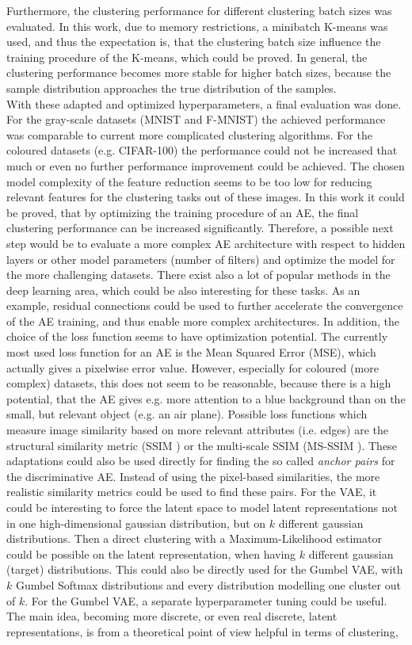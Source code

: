 \documentclass[12pt,DIV14,BCOR12mm,a4paper,footexclude,headinclude,halfparskip-,twoside,openright,cleardoubleempty,idxtotoc,bibtotoc,listtotoc,abstracton]{scrreprt} %
\numberwithin{equation}{chapter}
\begin{document}
Furthermore, the clustering performance for different clustering batch sizes was evaluated. In this work, due to memory restrictions, a minibatch K-means was used, and thus the expectation is, that the clustering batch size influence the training procedure of the K-means, which could be proved. In general, the clustering performance becomes more stable for higher batch sizes, because the sample distribution approaches the true distribution of the samples.\\
With these adapted and optimized hyperparameters, a final evaluation was done. For the gray-scale datasets (MNIST and F-MNIST) the achieved performance was comparable to current more complicated clustering algorithms. For the coloured datasets (e.g. CIFAR-100) the performance could not be increased that much or even no further performance improvement could be achieved. The chosen model complexity of the feature reduction seems to be too low for reducing relevant features for the clustering tasks out of these images. In this work it could be proved, that by optimizing the training procedure of an AE, the final clustering performance can be increased significantly. Therefore, a possible next step would be to evaluate a more complex AE architecture with respect to hidden layers or other model parameters (number of filters) and optimize the model for the more challenging datasets. There exist also a lot of popular methods in the deep learning area, which could be also interesting for these tasks. As an example, residual connections could be used to further accelerate the convergence of the AE training, and thus enable more complex architectures. In addition, the choice of the loss function seems to have optimization potential. The currently most used loss function for an AE is the Mean Squared Error (MSE), which actually gives a pixelwise error value. However, especially for coloured (more complex) datasets, this does not seem to be reasonable, because there is a high potential, that the AE gives e.g. more attention to a blue background than on the small, but relevant object (e.g. an air plane). Possible loss functions which measure image similarity based on more relevant attributes (i.e. edges) are the structural similarity metric (SSIM \cite{Wang04SSIM}) or the multi-scale SSIM (MS-SSIM \cite{Wang03MSSSIM}). These adaptations could also be used directly for finding the so called \textit{anchor pairs} for the discriminative AE. Instead of using the pixel-based similarities, the more realistic similarity metrics could be used to find these pairs. For the VAE, it could be interesting to force the latent space to model latent representations not in one high-dimensional gaussian distribution, but on $k$ different gaussian distributions. Then a direct clustering with a Maximum-Likelihood estimator could be possible on the latent representation, when having $k$ different gaussian (target) distributions. This could also be directly used for the Gumbel VAE, with $k$ Gumbel Softmax distributions and every distribution modelling one cluster out of $k$. For the Gumbel VAE, a separate hyperparameter tuning could be useful. The main idea, becoming more discrete, or even real discrete, latent representations, is from a theoretical point of view helpful in terms of clustering, 
\end{document}
